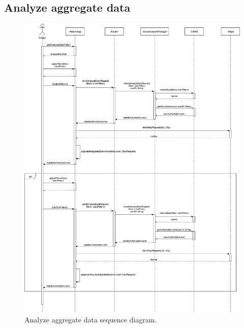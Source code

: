\subsection{Analyze aggregate data}
\begin{figure}[H]
	\centering
	\includegraphics[width=0.95\linewidth]{Images/SequenceDiagramAnalyzeAggregateData}
	\caption{Analyze aggregate data sequence diagram.}
\end{figure}
